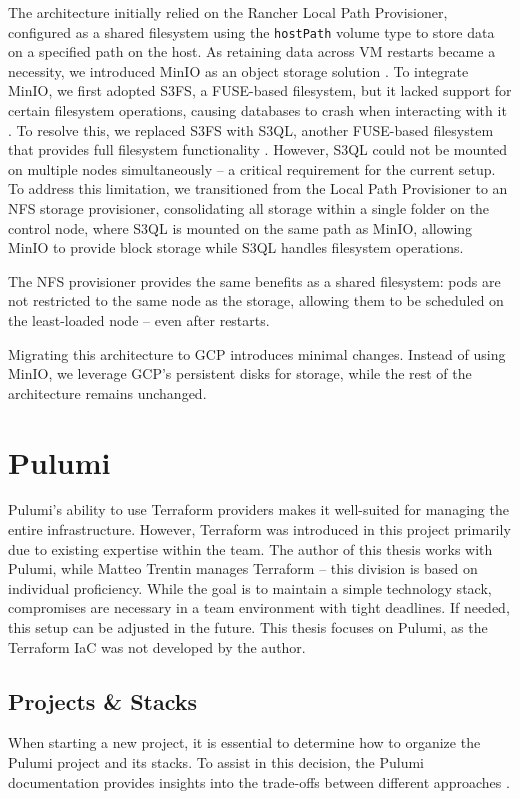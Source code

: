 The architecture initially relied on the Rancher Local Path Provisioner, configured as a shared filesystem using the \texttt{hostPath} volume type to store data on a specified path on the host. As retaining data across VM restarts became a necessity, we introduced MinIO as an object storage solution \Parencite{miniosdu}. To integrate MinIO, we first adopted S3FS, a FUSE-based filesystem, but it lacked support for certain filesystem operations, causing databases to crash when interacting with it \Parencite{s3fsrepo}. To resolve this, we replaced S3FS with S3QL, another FUSE-based filesystem that provides full filesystem functionality \Parencite{s3qlrepo}. However, S3QL could not be mounted on multiple nodes simultaneously \Parencite{s3qlfaq} -- a critical requirement for the current setup. To address this limitation, we transitioned from the Local Path Provisioner to an NFS storage provisioner, consolidating all storage within a single folder on the control node, where S3QL is mounted on the same path as MinIO, allowing MinIO to provide block storage while S3QL handles filesystem operations.

The NFS provisioner provides the same benefits as a shared filesystem: pods are not restricted to the same node as the storage, allowing them to be scheduled on the least-loaded node -- even after restarts.

Migrating this architecture to GCP introduces minimal changes. Instead of using MinIO, we leverage GCP's persistent disks for storage, while the rest of the architecture remains unchanged.

\section{Pulumi}
Pulumi's ability to use Terraform providers makes it well-suited for managing the entire infrastructure. However, Terraform was introduced in this project primarily due to existing expertise within the team. The author of this thesis works with Pulumi, while Matteo Trentin manages Terraform -- this division is based on individual proficiency. While the goal is to maintain a simple technology stack, compromises are necessary in a team environment with tight deadlines. If needed, this setup can be adjusted in the future. This thesis focuses on Pulumi, as the Terraform IaC was not developed by the author.

\subsection{Projects \& Stacks}
When starting a new project, it is essential to determine how to organize the Pulumi project and its stacks. To assist in this decision, the Pulumi documentation provides insights into the trade-offs between different approaches \Parencite{pulumiProjects2025}.

